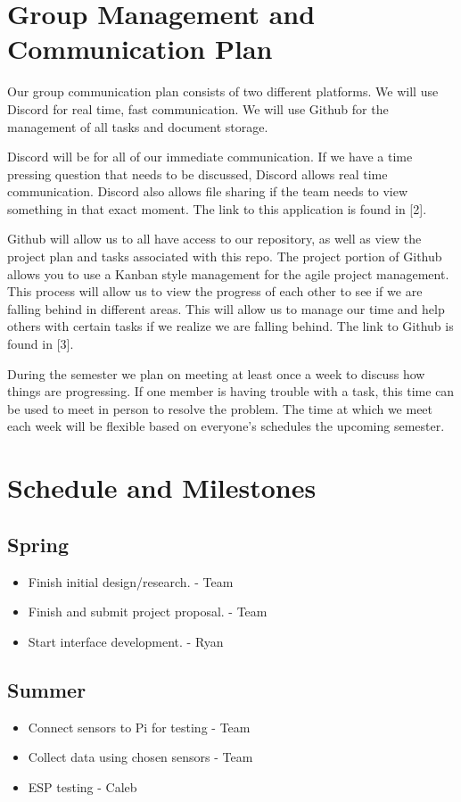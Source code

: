 \documentclass[letterpaper, 10 pt, conference]{ieeeconf}  %
\begin{document}
\section{Group Management and Communication Plan}
Our group communication plan consists of two different platforms. We will use Discord for real time, fast communication. We will use Github for the management of all tasks and document storage. 

Discord will be for all of our immediate communication. If we have a time pressing question that needs to be discussed, Discord allows real time communication. Discord also allows file sharing if the team needs to view something in that exact moment. The link to this application is found in [2].

Github will allow us to all have access to our repository, as well as view the project plan and tasks associated with this repo. The project portion of Github allows you to use a Kanban style management for the agile project management. This process will allow us to view the progress of each other to see if we are falling behind in different areas. This will allow us to manage our time and help others with certain tasks if we realize we are falling behind. The link to Github is found in [3]. 

During the semester we plan on meeting at least once a week to discuss how things are progressing. If one member is having trouble with a task, this time can be used to meet in person to resolve the problem. The time at which we meet each week will be flexible based on everyone's schedules the upcoming semester.

\section{Schedule and Milestones}
\subsection{Spring}
\begin{itemize}
    \item Finish initial design/research. - Team
    \item Finish and submit project proposal. - Team
    \item Start interface development. - Ryan
\end{itemize}

\subsection{Summer}
\begin{itemize}
    \item Connect sensors to Pi for testing - Team
    \item Collect data using chosen sensors - Team
    \item ESP testing - Caleb
\end{itemize}
\end{document}
